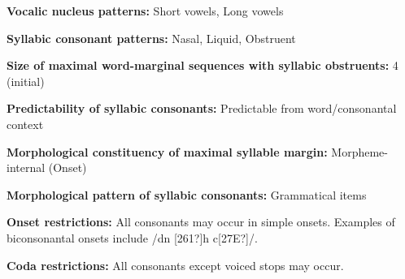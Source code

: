 \begin{styleBody}
\textbf{Vocalic nucleus patterns:} Short vowels, Long vowels
\end{styleBody}

\begin{styleBody}
\textbf{Syllabic consonant patterns:} Nasal, Liquid, Obstruent
\end{styleBody}

\begin{styleBody}
\textbf{Size of maximal word{}-marginal sequences with syllabic obstruents:} 4 (initial)
\end{styleBody}

\begin{styleBody}
\textbf{Predictability of syllabic consonants:} Predictable from word/consonantal context
\end{styleBody}

\begin{styleBody}
\textbf{Morphological constituency of maximal syllable margin:} Morpheme-internal (Onset)
\end{styleBody}

\begin{styleBody}
\textbf{Morphological pattern of syllabic consonants:} Grammatical items
\end{styleBody}

\begin{styleBody}
\textbf{Onset restrictions:} All consonants may occur in simple onsets. Examples of biconsonantal onsets include /dn [261?]h c[27E?]/.
\end{styleBody}

\begin{styleBody}
\textbf{Coda restrictions: }All consonants except voiced stops may occur.
\end{styleBody}

